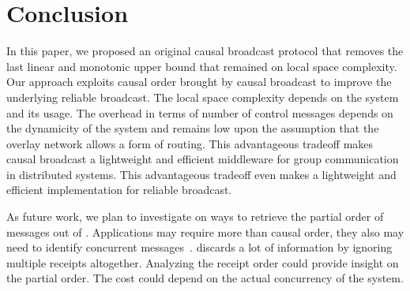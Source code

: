 
\section{Conclusion}
\label{sec:conclusion}


In this paper, we proposed an original causal broadcast protocol that removes
the last linear and monotonic upper bound that remained on local space
complexity. Our approach exploits causal order brought by causal broadcast to
improve the underlying reliable broadcast. The local space complexity depends on
the system and its usage. The overhead in terms of number of control messages
depends on the dynamicity of the system and remains low upon the assumption that
the overlay network allows a form of routing.
This advantageous tradeoff makes causal broadcast a lightweight and efficient
middleware for group communication in distributed systems. This advantageous
tradeoff even makes \RPCBROADCAST a lightweight and efficient implementation for
reliable broadcast. %

As future work, we plan to investigate on ways to retrieve the partial order of
messages out of \RPCBROADCAST. %
Applications may require more than causal order, they also may need to identify
concurrent messages~\cite{sun2009contextbased}. \RPCBROADCAST discards a lot of
information by ignoring multiple receipts altogether. Analyzing the receipt
order could provide insight on the partial order. The cost could depend on the
actual concurrency of the system.

